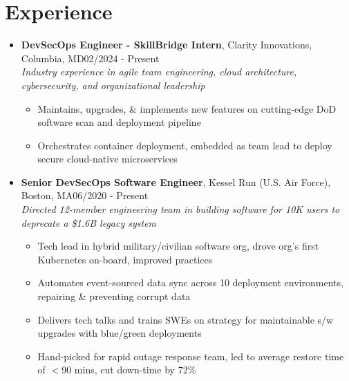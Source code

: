 \documentclass{article}
\begin{document}
\section{Experience} 
\begin{itemize}
    \itemsep0.2em
    \item \textbf{DevSecOps Engineer - SkillBridge Intern}, Clarity Innovations, Columbia, MD\hfill 02/2024 - Present \\ \emph{Industry experience in agile team engineering, cloud architecture, cybersecurity, and organizational leadership}
    \vspace{-\topsep} \vspace{0.2em}
    \begin{itemize}
        \itemsep0em
        \item Maintains, upgrades, \& implements new features on cutting-edge DoD software scan and deployment pipeline
        \item Orchestrates container deployment, embedded as team lead to deploy secure cloud-native microservices
    \end{itemize}
    
    \item \textbf{Senior DevSecOps Software Engineer}, Kessel Run (U.S. Air Force), Boston, MA\hfill 06/2020 - Present \\ \emph{Directed 12-member engineering team in building software for 10K users to deprecate a \$1.6B legacy system}
    \vspace{-\topsep} \vspace{0.2em}
    \begin{itemize}
        \itemsep0em
        \item Tech lead in hybrid military/civilian software org, drove org’s first Kubernetes on-board, improved practices
        \item Automates event-sourced data sync across 10 deployment environments, repairing \& preventing corrupt data
        \item Delivers tech talks and trains SWEs on strategy for maintainable s/w upgrades with blue/green deployments
        \item Hand-picked for rapid outage response team, led to average restore time of $<$90 mins, cut down-time by 72\%
    \end{itemize}
    

\end{itemize}
\end{document}
